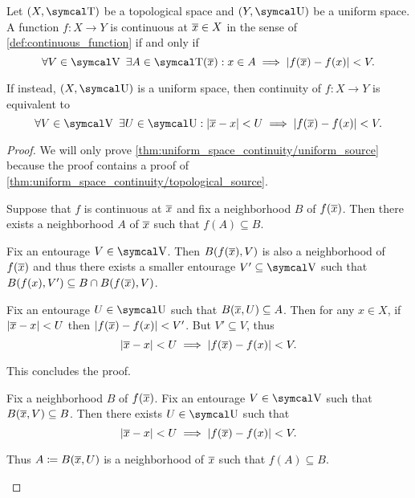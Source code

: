 \begin{proposition}\label{thm:uniform_space_continuity}
  Let \( (X, \T) \) be a topological space and \( (Y, \U) \) be a uniform space. A function \( f: X \to Y \) is continuous at \( \overline{x} \in X \) in the sense of \cref{def:continuous_function} if and only if
  \begin{equation}\label{thm:uniform_space_continuity/topological_source}
    \forall V \in \V \ \exists A \in \T(\Ol x) : x \in A \implies \Abs{f(\Ol{x}) - f(x)} < V.
  \end{equation}

  If instead, \( (X, \U) \) is a uniform space, then continuity of \( f: X \to Y \) is equivalent to
  \begin{equation}\label{thm:uniform_space_continuity/uniform_source}
    \forall V \in \V \ \exists U \in \U : \Abs{\Ol{x} - x} < U \implies \Abs{f(\Ol{x}) - f(x)} < V.
  \end{equation}
\end{proposition}
\begin{proof}
  We will only prove \cref{thm:uniform_space_continuity/uniform_source} because the proof contains a proof of \cref{thm:uniform_space_continuity/topological_source}.

  \begin{description}
    \Implies Suppose that \( f \) is continuous at \( \overline{x} \) and fix a neighborhood \( B \) of \( f(\overline{x}) \). Then there exists a neighborhood \( A \) of \( \overline{x} \) such that \( f(A) \subseteq B \).

    Fix an entourage \( V \in \V \). Then \( B(f(\overline{x}), V) \) is also a neighborhood of \( f(\overline{x}) \) and thus there exists a smaller entourage \( V' \subseteq \V \) such that \( B(f(x), V') \subseteq B \cap B(f(\overline{x}), V) \).

    Fix an entourage \( U \in \U \) such that \( B(\overline{x}, U) \subseteq A \). Then for any \( x \in X \), if \( \left\vert \overline{x} - x \right\vert < U \) then \( \left\vert f(\overline{x}) - f(x) \right\vert < V' \). But \( V' \subseteq V \), thus
    \begin{equation*}
      \left\vert \overline{x} - x \right\vert < U \implies \left\vert f(\overline{x}) - f(x) \right\vert < V.
    \end{equation*}

    This concludes the proof.

    \ImpliedBy Fix a neighborhood \( B \) of \( f(\overline{x}) \). Fix an entourage \( V \in \V \) such that \( B(\overline{x}, V) \subseteq B \). Then there exists \( U \in \U \) such that
    \begin{equation*}
      \left\vert \overline{x} - x \right\vert < U \implies \left\vert f(\overline{x}) - f(x) \right\vert < V.
    \end{equation*}

    Thus \( A \coloneqq B(\overline{x}, U) \) is a neighborhood of \( \overline{x} \) such that \( f(A) \subseteq B \).
  \end{description}
\end{proof}

